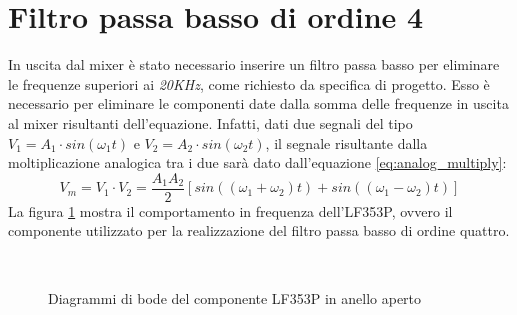 \documentclass[titlepage]{report}
\begin{document}
\section{Filtro passa basso di ordine 4}
	In uscita dal mixer è stato necessario inserire un filtro passa basso per eliminare le frequenze superiori ai \textit{20KHz}, come richiesto da specifica di progetto. Esso è necessario per eliminare le componenti date dalla somma delle frequenze in uscita al mixer risultanti dell'equazione. Infatti, dati due segnali del tipo $ V_1 = A_1 \cdot sin(\omega_1t) $
	e $ V_2 = A_2 \cdot sin(\omega_2t) $, il segnale risultante dalla moltiplicazione analogica tra i due sarà dato dall'equazione \ref{eq:analog_multiply}:
	\begin{equation}
		V_m = V_1 \cdot V_2 = \frac{A_1A_2}{2}[sin((\omega_1 + \omega_2)t) + sin((\omega_1 - \omega_2)t)]
		\label{eq:analog_multiply}
	\end{equation}
	La figura \ref{fig:bode_LF353P} mostra il comportamento in frequenza dell'LF353P, ovvero il componente utilizzato per la realizzazione del filtro passa basso di ordine quattro.

	\begin{figure}[h]
		\centering
		 \qquad
		 \\
		\caption{Diagrammi di bode del componente LF353P in anello aperto}
		\label{fig:bode_LF353P}
	\end{figure}
\end{document}
